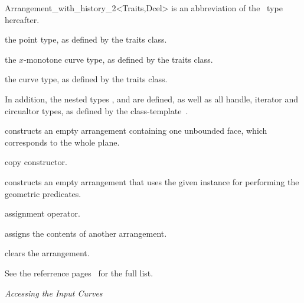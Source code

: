 \begin{ccRefClass}{Arrangement_with_history_2<Traits,Dcel>}
 is an abbreviation of the \ccRefName\ type hereafter.


\ccTypes

\ccGlue
{}

  {the point type, as defined by the traits class.}

  {the $x$-monotone curve type, as defined by the traits class.}

  {the curve type, as defined by the traits class.}

In addition, the nested types ,  and 
are defined, as well as all handle, iterator and circualtor types, as
defined by the 
class-template~.

\ccCreation
{}
    
    {constructs an empty arrangement containing one unbounded face,
     which corresponds to the
     whole plane.}
    
    {copy constructor.}
        
    {constructs an empty arrangement that uses the given 
     instance for performing the geometric predicates.}



    {assignment operator.}

    {assigns the contents of another arrangement.}

    {clears the arrangement.}


\ccAccessFunctions

See the  referrence pages~ for the full list.


{\sl Accessing the Input Curves}


\end{ccRefClass}
